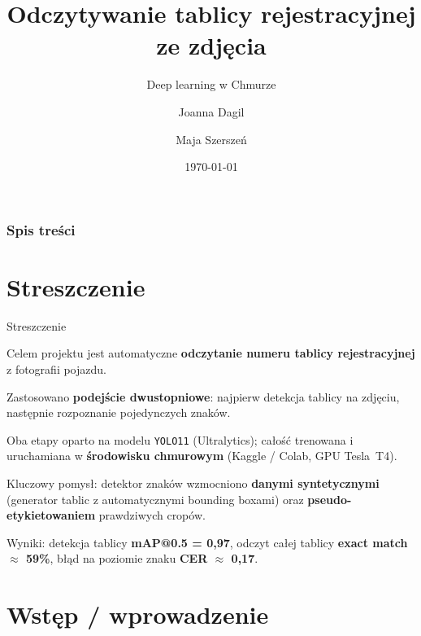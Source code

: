 \documentclass{beamer}
\title[Odczyt tablicy rejestracyjnej]{Odczytywanie tablicy rejestracyjnej ze zdjęcia}
\subtitle{Deep learning w Chmurze}
\author{Joanna Dagil \and Maja Szerszeń}
\date{\today}
\begin{document}
\frame{\titlepage}


\begin{frame}
\frametitle{Spis treści}
\tableofcontents
\end{frame}


\section{Streszczenie}

\begin{frame}{Streszczenie}


    Celem projektu jest automatyczne \textbf{odczytanie numeru tablicy rejestracyjnej} z fotografii pojazdu.

    \vspace{0.3cm}

    Zastosowano \textbf{podejście dwustopniowe}: najpierw detekcja tablicy na zdjęciu, następnie rozpoznanie pojedynczych znaków.

    Oba etapy oparto na modelu \texttt{YOLO11} (Ultralytics); całość trenowana i uruchamiana w \textbf{środowisku chmurowym} (Kaggle / Colab, GPU Tesla~T4).
    
    \vspace{0.3cm}

    Kluczowy pomysł: detektor znaków wzmocniono \textbf{danymi syntetycznymi} (generator tablic z automatycznymi bounding boxami) oraz \textbf{pseudo-etykietowaniem} prawdziwych cropów.

    \vspace{0.3cm}

    Wyniki: detekcja tablicy \textbf{mAP@0.5 = 0{,}97}, odczyt całej tablicy \textbf{exact match $\approx$ 59\%}, błąd na poziomie znaku \textbf{CER $\approx$ 0{,}17}.

\end{frame}






\section{Wstęp / wprowadzenie}
\end{document}
